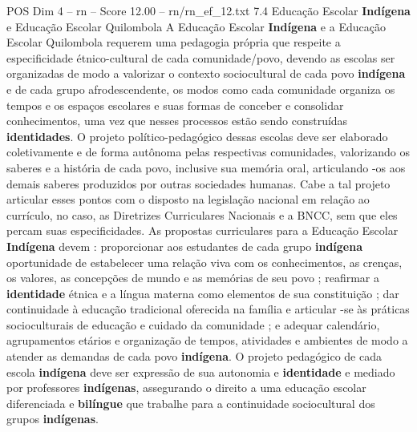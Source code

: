 \begin{textsample}{POS Dim 4 – rn – Score 12.00 – rn/rn\_ef\_12.txt}  \label{ex:f4_pos_085}
7.4 Educação Escolar \textbf{Indígena} e Educação Escolar Quilombola A Educação Escolar \textbf{Indígena} e a Educação Escolar Quilombola requerem uma pedagogia própria que respeite a especificidade étnico-cultural de cada comunidade/povo, devendo as escolas ser organizadas de modo a valorizar o contexto sociocultural de cada povo \textbf{indígena} e de cada grupo afrodescendente, os modos como cada comunidade organiza os tempos e os espaços escolares e suas formas de conceber e consolidar conhecimentos, uma vez que nesses processos estão sendo construídas \textbf{identidades}.
O projeto político-pedagógico dessas escolas deve ser elaborado coletivamente e de forma autônoma pelas respectivas comunidades, valorizando os saberes e a história de cada povo, inclusive sua memória oral, articulando -os aos demais saberes produzidos por outras sociedades humanas.
Cabe a tal projeto articular esses pontos com o disposto na legislação nacional em relação ao currículo, no caso, as Diretrizes Curriculares Nacionais e a BNCC, sem que eles percam suas especificidades.
As propostas curriculares para a Educação Escolar \textbf{Indígena} devem : proporcionar aos estudantes de cada grupo \textbf{indígena} oportunidade de estabelecer uma relação viva com os conhecimentos, as crenças, os valores, as concepções de mundo e as memórias de seu povo ; reafirmar a \textbf{identidade} étnica e a língua materna como elementos de sua constituição ; dar continuidade à educação tradicional oferecida na família e articular -se às práticas socioculturais de educação e cuidado da comunidade ; e adequar calendário, agrupamentos etários e organização de tempos, atividades e ambientes de modo a atender as demandas de cada povo \textbf{indígena}.
O projeto pedagógico de cada escola \textbf{indígena} deve ser expressão de sua autonomia e \textbf{identidade} e mediado por professores \textbf{indígenas}, assegurando o direito a uma educação escolar diferenciada e \textbf{bilíngue} que trabalhe para a continuidade sociocultural dos grupos \textbf{indígenas}.

\end{textsample}

